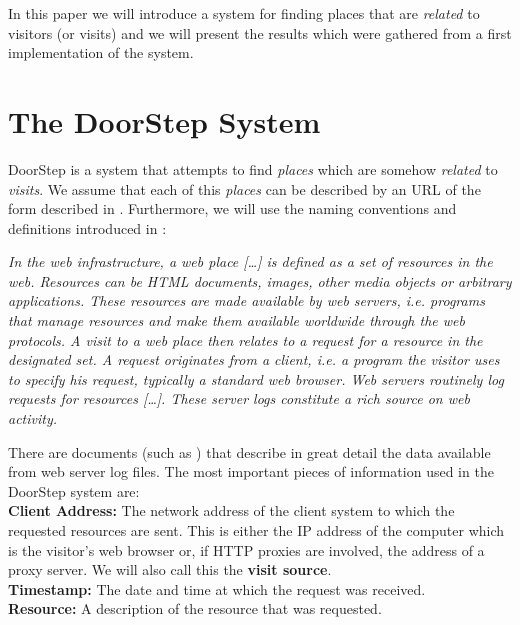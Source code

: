\documentclass[a4paper]{danarticle}
\theoremstyle{remark}
\begin{document}
    In this paper we will introduce a system for finding places that are 
    \textit{related} to
    visitors (or visits) and we will present the results which were gathered 
    from a first implementation of the system.
  \section{The DoorStep System}
    DoorStep is a system that attempts to find \textit{places} which are somehow
    \textit{related} to \textit{visits}. We assume that each
    of this \textit{places} can be described by an URL of the form described in
    \cite{url}. Furthermore, we will use the naming conventions and definitions
    introduced in \cite{webaware}:
    \begin{center}
    \begin{minipage}{10cm}
    \itshape
    In the web infrastructure, a web place [\dots] is defined as 
    a set of resources in the web. Resources can
    be HTML documents, images, other media objects or arbitrary applications.
    These resources are made available by web servers, i.e. programs that manage
    resources and make them available worldwide through the web protocols. A
    visit to a web place then relates to a request for a resource in the
    designated set. A request originates from a client, i.e. a program the
    visitor uses to specify his request, typically a standard web browser. Web
    servers routinely log requests for resources [\dots]. These server logs
    constitute a rich source on web activity.
    \end{minipage}
    \end{center}
    There are documents (such as \cite{logfile}) that describe in great detail 
    the data available from web server log files. The most important pieces of
    information used in the DoorStep system are:
    \\
    
    \textbf{Client Address:} The network address of the client system to which 
    the requested resources are sent. This is either the IP address of the 
    computer which is the visitor's web browser or, if HTTP proxies are 
    involved, the address of a proxy server. We will also call this the 
    \textbf{visit source}.
    \\
    
    \textbf{Timestamp:} The date and time at which the request was received.
    \\
    
    \textbf{Resource:} A description of the resource that was requested.
    \\
    
\end{document}
